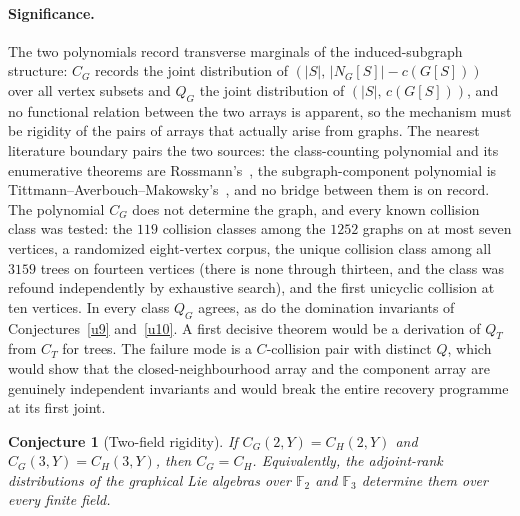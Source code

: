\documentclass[11pt]{article}
\newtheorem{conjecture}{Conjecture}
\theoremstyle{definition}
\newcommand{\Fq}{\mathbb F}
\begin{document}
\paragraph{Significance.}
The two polynomials record transverse marginals of the induced-subgraph structure: $C_G$ records the joint distribution of $(|S|,\,|N_G[S]|-c(G[S]))$ over all vertex subsets and $Q_G$ the joint distribution of $(|S|,\,c(G[S]))$, and no functional relation between the two arrays is apparent, so the mechanism must be rigidity of the pairs of arrays that actually arise from graphs.  The nearest literature boundary pairs the two sources: the class-counting polynomial and its enumerative theorems are Rossmann's~\cite{Ros22}, the subgraph-component polynomial is Tittmann--Averbouch--Makowsky's~\cite{TAM11}, and no bridge between them is on record.  The polynomial $C_G$ does not determine the graph, and every known collision class was tested: the $119$ collision classes among the $1252$ graphs on at most seven vertices, a randomized eight-vertex corpus, the unique collision class among all $3159$ trees on fourteen vertices (there is none through thirteen, and the class was refound independently by exhaustive search), and the first unicyclic collision at ten vertices.  In every class $Q_G$ agrees, as do the domination invariants of Conjectures~\ref{u9} and~\ref{u10}.  A first decisive theorem would be a derivation of $Q_T$ from $C_T$ for trees.  The failure mode is a $C$-collision pair with distinct $Q$, which would show that the closed-neighbourhood array and the component array are genuinely independent invariants and would break the entire recovery programme at its first joint.


\begin{conjecture}[Two-field rigidity]\label{u3}
If $C_G(2,Y)=C_H(2,Y)$ and $C_G(3,Y)=C_H(3,Y)$, then $C_G=C_H$.  Equivalently, the adjoint-rank distributions of the graphical Lie algebras over $\Fq_2$ and $\Fq_3$ determine them over every finite field.
\end{conjecture}
\end{document}

